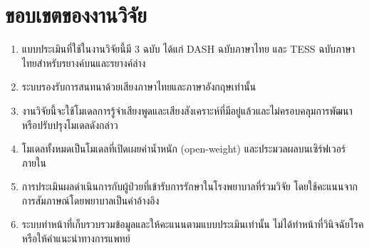 \section{ขอบเขตของงานวิจัย}
\label{sec:scope}

\begin{enumerate}
    \item แบบประเมินที่ใช้ในงานวิจัยนี้มี 3 ฉบับ ได้แก่ DASH ฉบับภาษาไทย และ TESS ฉบับภาษาไทยสำหรับรยางค์บนและรยางค์ล่าง
    \item ระบบรองรับการสนทนาด้วยเสียงภาษาไทยและภาษาอังกฤษเท่านั้น
    \item งานวิจัยนี้จะใช้โมเดลการรู้จำเสียงพูดและเสียงสังเคราะห์ที่มีอยู่แล้วและไม่ครอบคลุมการพัฒนาหรือปรับปรุงโมเดลดังกล่าว
    \item โมเดลทั้งหมดเป็นโมเดลที่เปิดเผยค่าน้ำหนัก (open-weight) และประมวลผลบนเซิร์ฟเวอร์ภายใน
    \item การประเมินผลดำเนินการกับผู้ป่วยที่เข้ารับการรักษาในโรงพยาบาลที่ร่วมวิจัย โดยใช้คะแนนจากการสัมภาษณ์โดยพยาบาลเป็นค่าอ้างอิง
    \item ระบบทำหน้าที่เก็บรวบรวมข้อมูลและให้คะแนนตามแบบประเมินเท่านั้น ไม่ได้ทำหน้าที่วินิจฉัยโรคหรือให้คำแนะนำทางการแพทย์
\end{enumerate}
